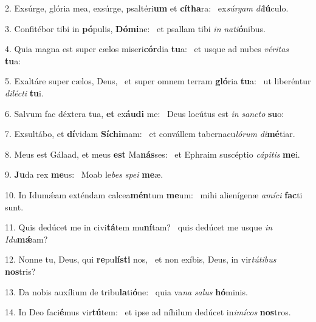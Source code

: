2. Exsúrge, glória mea, exsúrge, psaltéri\textbf{um} et \textbf{cí}\textbf{tha}ra: \ast\  ex\textit{súr}\textit{gam} \textit{di}\textbf{lú}culo.\

3. Confitébor tibi in \textbf{pó}pulis, \textbf{Dó}\textbf{mi}ne: \ast\  et psallam tibi \textit{in} \textit{na}\textit{ti}\textbf{ó}nibus.\

4. Quia magna est super cælos miseri\textbf{cór}dia \textbf{tu}a: \ast\  et usque ad nubes \textit{vé}\textit{ri}\textit{tas} \textbf{tu}a:\

5. Exaltáre super cælos, Deus, \dag\  et super omnem terram \textbf{gló}ria \textbf{tu}a: \ast\  ut liberéntur \textit{di}\textit{léc}\textit{ti} \textbf{tu}i.\

6. Salvum fac déxtera tua, \textbf{et} ex\textbf{áu}\textbf{di} me: \ast\  Deus locútus est \textit{in} \textit{sanc}\textit{to} \textbf{su}o:\

7. Exsultábo, et \textbf{dí}vidam \textbf{Sí}\textbf{chi}mam: \ast\  et convállem tabernacu\textit{ló}\textit{rum} \textit{di}\textbf{mé}tiar.\

8. Meus est Gálaad, et meus \textbf{est} Ma\textbf{nás}ses: \ast\  et Ephraim suscéptio \textit{cá}\textit{pi}\textit{tis} \textbf{me}i.\

9. \textbf{Ju}da rex \textbf{me}us: \ast\  Moab le\textit{bes} \textit{spe}\textit{i} \textbf{me}æ.\

10. In Idumǽam exténdam calcea\textbf{mén}tum \textbf{me}um: \ast\  mihi alienígenæ \textit{a}\textit{mí}\textit{ci} \textbf{fac}ti sunt.\

11. Quis dedúcet me in civi\textbf{tá}tem mu\textbf{ní}tam? \ast\  quis dedúcet me usque \textit{in} \textit{I}\textit{du}\textbf{mǽ}am?\

12. Nonne tu, Deus, qui \textbf{re}pu\textbf{lís}\textbf{ti} nos, \ast\  et non exíbis, Deus, in vir\textit{tú}\textit{ti}\textit{bus} \textbf{nos}tris?\

13. Da nobis auxílium de tribu\textbf{la}ti\textbf{ó}ne: \ast\  quia va\textit{na} \textit{sa}\textit{lus} \textbf{hó}minis.\

14. In Deo faci\textbf{é}mus vir\textbf{tú}tem: \ast\  et ipse ad níhilum dedúcet in\textit{i}\textit{mí}\textit{cos} \textbf{nos}tros.\

